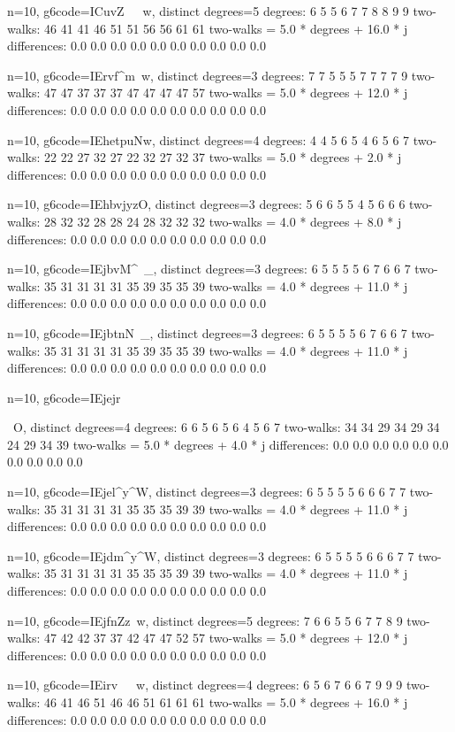 {{{{{{{{{{{{{{n=10, g6code=ICuvZ~~~w, distinct degrees=5
degrees: 6 5 5 6 7 7 8 8 9 9 
two-walks: 46 41 41 46 51 51 56 56 61 61 
two-walks = 5.0 * degrees + 16.0 * j
differences: 0.0 0.0 0.0 0.0 0.0 0.0 0.0 0.0 0.0 0.0 

n=10, g6code=IErvf^m~w, distinct degrees=3
degrees: 7 7 5 5 5 7 7 7 7 9 
two-walks: 47 47 37 37 37 47 47 47 47 57 
two-walks = 5.0 * degrees + 12.0 * j
differences: 0.0 0.0 0.0 0.0 0.0 0.0 0.0 0.0 0.0 0.0 

n=10, g6code=IEhetpuNw, distinct degrees=4
degrees: 4 4 5 6 5 4 6 5 6 7 
two-walks: 22 22 27 32 27 22 32 27 32 37 
two-walks = 5.0 * degrees + 2.0 * j
differences: 0.0 0.0 0.0 0.0 0.0 0.0 0.0 0.0 0.0 0.0 

n=10, g6code=IEhbvjyzO, distinct degrees=3
degrees: 5 6 6 5 5 4 5 6 6 6 
two-walks: 28 32 32 28 28 24 28 32 32 32 
two-walks = 4.0 * degrees + 8.0 * j
differences: 0.0 0.0 0.0 0.0 0.0 0.0 0.0 0.0 0.0 0.0 

n=10, g6code=IEjbvM^~_, distinct degrees=3
degrees: 6 5 5 5 5 6 7 6 6 7 
two-walks: 35 31 31 31 31 35 39 35 35 39 
two-walks = 4.0 * degrees + 11.0 * j
differences: 0.0 0.0 0.0 0.0 0.0 0.0 0.0 0.0 0.0 0.0 

n=10, g6code=IEjbtnN~_, distinct degrees=3
degrees: 6 5 5 5 5 6 7 6 6 7 
two-walks: 35 31 31 31 31 35 39 35 35 39 
two-walks = 4.0 * degrees + 11.0 * j
differences: 0.0 0.0 0.0 0.0 0.0 0.0 0.0 0.0 0.0 0.0 

n=10, g6code=IEjejr{~O, distinct degrees=4
degrees: 6 6 5 6 5 6 4 5 6 7 
two-walks: 34 34 29 34 29 34 24 29 34 39 
two-walks = 5.0 * degrees + 4.0 * j
differences: 0.0 0.0 0.0 0.0 0.0 0.0 0.0 0.0 0.0 0.0 

n=10, g6code=IEjel^y^W, distinct degrees=3
degrees: 6 5 5 5 5 6 6 6 7 7 
two-walks: 35 31 31 31 31 35 35 35 39 39 
two-walks = 4.0 * degrees + 11.0 * j
differences: 0.0 0.0 0.0 0.0 0.0 0.0 0.0 0.0 0.0 0.0 

n=10, g6code=IEjdm^y^W, distinct degrees=3
degrees: 6 5 5 5 5 6 6 6 7 7 
two-walks: 35 31 31 31 31 35 35 35 39 39 
two-walks = 4.0 * degrees + 11.0 * j
differences: 0.0 0.0 0.0 0.0 0.0 0.0 0.0 0.0 0.0 0.0 

n=10, g6code=IEjfnZz~w, distinct degrees=5
degrees: 7 6 6 5 5 6 7 7 8 9 
two-walks: 47 42 42 37 37 42 47 47 52 57 
two-walks = 5.0 * degrees + 12.0 * j
differences: 0.0 0.0 0.0 0.0 0.0 0.0 0.0 0.0 0.0 0.0 

n=10, g6code=IEirv~~~w, distinct degrees=4
degrees: 6 5 6 7 6 6 7 9 9 9 
two-walks: 46 41 46 51 46 46 51 61 61 61 
two-walks = 5.0 * degrees + 16.0 * j
differences: 0.0 0.0 0.0 0.0 0.0 0.0 0.0 0.0 0.0 0.0 

}}}}}}}}}}}}}}}
